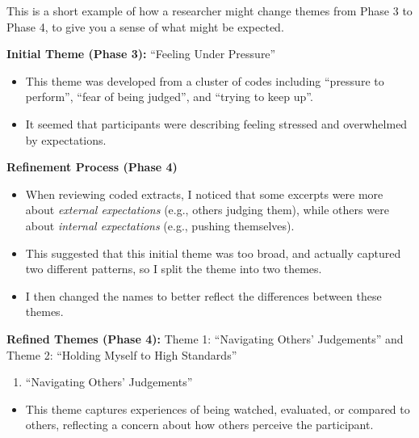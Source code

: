 \documentclass[
  english,
  letterpaper,
  DIV=11,
  numbers=noendperiod]{scrreprt}
\providecommand{\tightlist}{%
  \setlength{\itemsep}{0pt}\setlength{\parskip}{0pt}}
\begin{document}
\begin{tcolorbox}[enhanced jigsaw, breakable, bottomtitle=1mm, leftrule=.75mm, opacityback=0, colbacktitle=quarto-callout-warning-color!10!white, opacitybacktitle=0.6, toprule=.15mm, colback=white, left=2mm, coltitle=black, bottomrule=.15mm, titlerule=0mm, title={Example}, toptitle=1mm, colframe=quarto-callout-warning-color-frame, arc=.35mm, rightrule=.15mm]

This is a short example of how a researcher might change themes from
Phase 3 to Phase 4, to give you a sense of what might be expected.

\textbf{Initial Theme (Phase 3):} ``Feeling Under Pressure''

\begin{itemize}
\tightlist
\item
  This theme was developed from a cluster of codes including ``pressure
  to perform'', ``fear of being judged'', and ``trying to keep up''.
\item
  It seemed that participants were describing feeling stressed and
  overwhelmed by expectations.
\end{itemize}

\textbf{Refinement Process (Phase 4)}

\begin{itemize}
\tightlist
\item
  When reviewing coded extracts, I noticed that some excerpts were more
  about \emph{external expectations} (e.g., others judging them), while
  others were about \emph{internal expectations} (e.g., pushing
  themselves).
\item
  This suggested that this initial theme was too broad, and actually
  captured two different patterns, so I split the theme into two themes.
\item
  I then changed the names to better reflect the differences between
  these themes.
\end{itemize}

\textbf{Refined Themes (Phase 4):} Theme 1: ``Navigating Others'
Judgements'' and Theme 2: ``Holding Myself to High Standards''

\begin{enumerate}
\def\labelenumi{\arabic{enumi}.}
\tightlist
\item
  ``Navigating Others' Judgements''
\end{enumerate}

\begin{itemize}
\tightlist
\item
  This theme captures experiences of being watched, evaluated, or
  compared to others, reflecting a concern about how others perceive the
  participant.
\end{itemize}


\end{tcolorbox}
\end{document}
